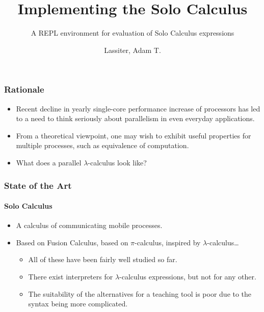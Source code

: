 \documentclass{beamer}
\title{Implementing the Solo Calculus}
\subtitle{A REPL environment for evaluation of Solo Calculus expressions}
\author{Lassiter, Adam T.}
\institute[University of Bath]{
    Department of Computer Science\\
    University of Bath
}
\begin{document}
    \frame{\titlepage}



    \begin{frame}
        \frametitle{Rationale}
        \begin{itemize}
            \item Recent decline in yearly single-core performance increase of processors has led to a need to think seriously about parallelism in even everyday applications.
            \item From a theoretical viewpoint, one may wish to exhibit useful properties for multiple processes, such as equivalence of computation.
            \item What does a parallel $\lambda$-calculus look like?
        \end{itemize}
    \end{frame}



    \begin{frame}
        \frametitle{State of the Art}
        \framesubtitle{Solo Calculus}
        \begin{itemize}
            \item A calculus of communicating mobile processes.
            \item Based on Fusion Calculus, based on $\pi$-calculus, inspired by $\lambda$-calculus\ldots
            \begin{itemize}
                \item All of these have been fairly well studied so far.
                \item There exist interpreters for $\lambda$-calculus expressions, but not for any other.
                \item The suitability of the alternatives for a teaching tool is poor due to the syntax being more complicated.
            \end{itemize}
        \end{itemize}
    \end{frame}
\end{document}
